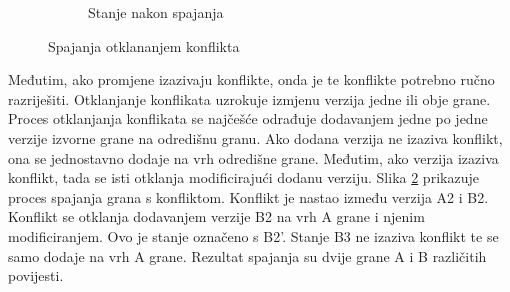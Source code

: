 \documentclass[times, utf8, diplomski, numeric]{fer}
\begin{document}
\begin{figure}
\begin{subfigure}{.49\textwidth}
\caption{Stanje nakon spajanja}
\label{fig:ConflictB}
\end{subfigure}
\caption{Spajanja otklananjem konflikta}
\label{fig:Conflict}
\end{figure}

Međutim, ako promjene izazivaju konflikte, onda je te konflikte potrebno ručno razriješiti. Otklanjanje konflikata uzrokuje izmjenu verzija jedne ili obje grane. Proces otklanjanja konflikata se najčešće odrađuje dodavanjem jedne po jedne verzije izvorne grane na odredišnu granu. Ako dodana verzija ne izaziva konflikt, ona se jednostavno dodaje na vrh odredišne grane. Međutim, ako verzija izaziva konflikt, tada se isti otklanja modificirajući dodanu verziju. Slika \ref{fig:Conflict} prikazuje proces spajanja grana s konfliktom. Konflikt je nastao između verzija A2 i B2. Konflikt se otklanja dodavanjem verzije B2 na vrh A grane i njenim modificiranjem. Ovo je stanje označeno s B2'. Stanje B3 ne izaziva konflikt te se samo dodaje na vrh A grane. Rezultat spajanja su dvije grane A i B različitih povijesti.
\end{document}
